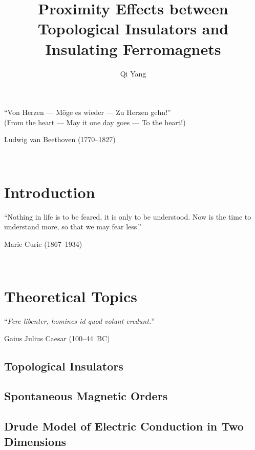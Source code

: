 ﻿\documentclass{report}
\begin{document}
\title{Proximity Effects between Topological Insulators and Insulating Ferromagnets}
\author{Qi Yang}

\keepXColumns

\beforepreface
%
    
%
\chapter*{}
    
%
\epigraph{``Von Herzen --- M\"oge es wieder --- Zu Herzen gehn!''\\(From the heart --- May it one day goes --- To the heart!)}{Ludwig van Beethoven (1770--1827)}~\\
    
%
\afterpreface
\captionsetup{width=0.95\columnwidth}%
%
\chapter{Introduction}\label{ch:intro}
\epigraph{``Nothing in life is to be feared, it is only to be understood. Now is the time to understand more, so that we may fear less.''}{Marie Curie (1867--1934)}~\\
    

\chapter{Theoretical Topics}\label{ch:theory}
\epigraph{``\textit{Fere libenter, homines id quod volunt credunt.}''}{Gaius Julius Caesar (100--44~BC)}
    \section{Topological Insulators}\label{sec:ti}
        
    \section{Spontaneous Magnetic Orders}\label{sec:magnetism}
        
    \section{Drude Model of Electric Conduction in Two Dimensions}\label{sec:drude}
        
\end{document}
